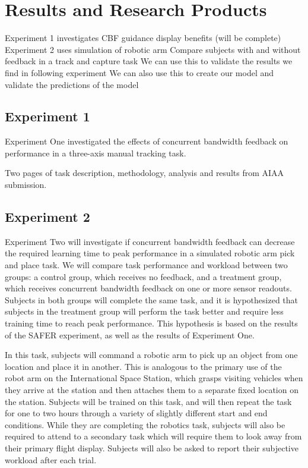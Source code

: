 \documentclass[float=false, crop=false]{standalone}
\begin{document}
\section{Results and Research Products}
Experiment 1 investigates CBF guidance display benefits (will be complete)
Experiment 2 uses simulation of robotic arm
Compare subjects with and without feedback in a track and capture task
We can use this to validate the results we find in following experiment
We can also use this to create our model and validate the predictions of the model

\subsection{Experiment 1}
Experiment One investigated the effects of concurrent bandwidth feedback on performance in a three-axis manual tracking task.

Two pages of task description, methodology, analysis and results from AIAA submission.

\subsection{Experiment 2}
Experiment Two will investigate if concurrent bandwidth feedback can decrease the required learning time to peak performance in a simulated robotic arm pick and place task.
We will compare task performance and workload between two groups: a control group, which receives no feedback, and a treatment group, which receives concurrent bandwidth feedback on one or more sensor readouts.
Subjects in both groups will complete the same task, and it is hypothesized that subjects in the treatment group will perform the task better and require less training time to reach peak performance.
This hypothesis is based on the results of the SAFER experiment, as well as the results of Experiment One.

In this task, subjects will command a robotic arm to pick up an object from one location and place it in another.
This is analogous to the primary use of the robot arm on the International Space Station, which grasps visiting vehicles when they arrive at the station and then attaches them to a separate fixed location on the station.
Subjects will be trained on this task, and will then repeat the task for one to two hours through a variety of slightly different start and end conditions.
While they are completing the robotics task, subjects will also be required to attend to a secondary task which will require them to look away from their primary flight display.
Subjects will also be asked to report their subjective workload after each trial.
\end{document}
